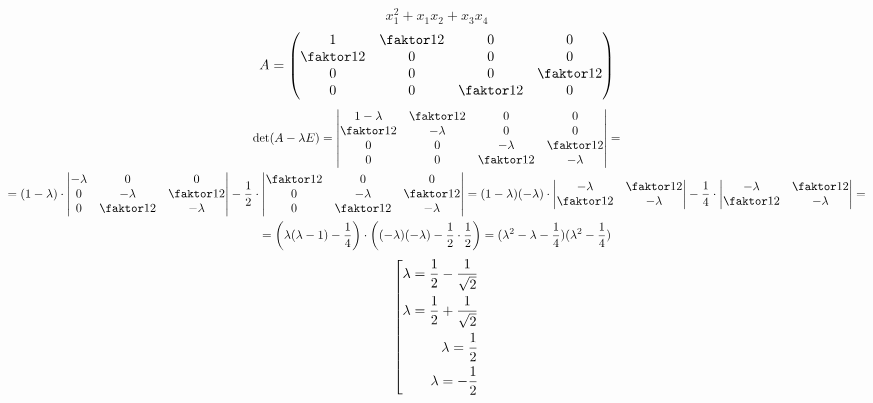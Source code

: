 $$ x_1^2 + x_1x_2 + x_3x_4 $$
$$ A =
\begin{pmatrix}
    1 & \faktor12 & 0 & 0 \\
    \faktor12 & 0 & 0 & 0 \\
    0 & 0 & 0 & \faktor12 \\
    0 & 0 & \faktor12 & 0
\end{pmatrix} $$
\begin{multline*}
    $$ \det(A - \lambda E) =
    \begin{vmatrix}
        1 - \lambda & \faktor12 & 0 & 0 \\
        \faktor12 & -\lambda & 0 & 0 \\
        0 & 0 & -\lambda & \faktor12 \\
        0 & 0 & \faktor12 & -\lambda
    \end{vmatrix} = \\
    = (1 - \lambda) \cdot
    \begin{vmatrix}
        -\lambda & 0 & 0 \\
        0 & -\lambda & \faktor12 \\
        0 & \faktor12 & -\lambda
    \end{vmatrix} - \half \cdot
    \begin{vmatrix}
        \faktor12 & 0 & 0 \\
        0 & -\lambda & \faktor12 \\
        0 & \faktor12 & -\lambda
    \end{vmatrix} = (1 - \lambda)(-\lambda) \cdot
    \begin{vmatrix}
    	-\lambda & \faktor12 \\
        \faktor12 & -\lambda
    \end{vmatrix} - \frac14 \cdot
    \begin{vmatrix}
    	-\lambda & \faktor12 \\
        \faktor12 & -\lambda
    \end{vmatrix} = \\
    = \bigg( \lambda(\lambda - 1) - \frac14 \bigg) \cdot \bigg( (-\lambda)(-\lambda) - \half \cdot \half \bigg) = (\lambda^2 - \lambda - \frac14)(\lambda^2 - \frac14)
\end{multline*}
$$ \left[
\begin{aligned}
    \lambda = \frac{1}2 - \frac1{\sqrt2} \\
    \lambda = \frac{1}2 + \frac1{\sqrt2} \\
    \lambda = \frac{1}2 \\
    \lambda = -\frac{1}2
\end{aligned} \right. $$

